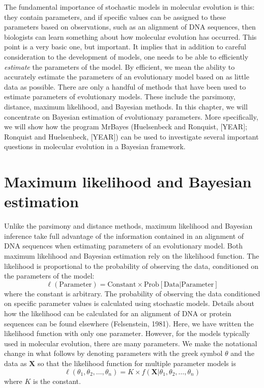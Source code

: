 \documentclass{svmult}
\begin{document}
The fundamental importance of stochastic models in molecular evolution is this: they contain
parameters, and if specific values can be assigned to these parameters based on observations, such as
an alignment of DNA sequences, then biologists can learn something about how molecular evolution has
occurred. This point is a very basic one, but important. It implies that in addition to careful
consideration to the development of models, one needs to be able to efficiently {\it estimate} the
parameters of the model. By efficient, we mean the ability to accurately estimate the
parameters of an evolutionary model based on as little data as possible. There are only a handful
of methods that have been used to estimate parameters of evolutionary models. These include the
parsimony, distance, maximum likelihood, and Bayesian methods. In this chapter, we will concentrate on
Bayesian estimation of evolutionary parameters. More specifically, we will show how the program MrBayes
(Huelsenbeck and Ronquist, [YEAR]; Ronquist and Huelsenbeck, [YEAR]) can be used to investigate several
important questions in molecular evolution in a Bayesian framework.


\section{Maximum likelihood and Bayesian estimation}
\label{sec:2}

Unlike the parsimony and distance methods,
maximum likelihood and Bayesian inference take full advantage of the information contained in an
alignment of DNA sequences when estimating parameters of an evolutionary model. Both maximum
likelihood and Bayesian estimation rely on the likelihood function. The likelihood is proportional to
the probability of observing the data, conditioned on the parameters of the model:
$$
\ell(\mbox{Parameter}) = \mbox{Constant} \times \mbox{Prob}[\mbox{Data} | \mbox{Parameter}]
$$
where the constant is arbitrary. The probability of observing the data conditioned on specific
parameter values is calculated using stochastic models. Details about how the likelihood
can be calculated for an alignment of DNA or protein sequences can be found elsewhere (Felsenstein, 1981).
Here, we have written the likelihood
function with only one parameter. However, for the models typically used in molecular evolution,
there are many parameters.
We make the notational change in what follows by denoting parameters with the
greek symbol $\theta$ and the data as $\mathbf{X}$ so that the likelihood function for multiple
parameter models is
$$
\ell(\theta_1, \theta_2, \ldots, \theta_n) = K \times f(\mathbf{X} | \theta_1, \theta_2, \ldots,
\theta_n)
$$ 
where $K$ is the constant.
\end{document}
